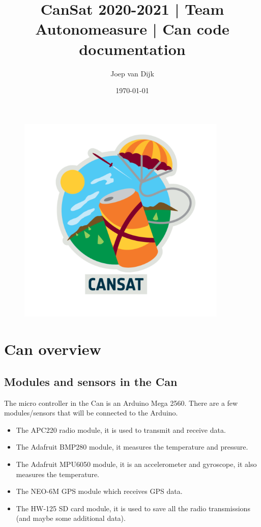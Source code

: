 \documentclass[a4paper,10pt]{article}
\author{Joep van Dijk}
\title{CanSat 2020-2021 | Team Autonomeasure | Can code documentation}
\date{\today}
\begin{document}
	\maketitle
	
	
	\begin{figure}[!h]
		\centering
		\includegraphics[width=100mm]{CanSat_logo}
	\end{figure}
	
	\clearpage
	
	\tableofcontents
	
	\clearpage
	
	
	
	\section[Can]{Can overview}
		\subsection[Modules]{Modules and sensors in the Can}
			The micro controller in the Can is an Arduino Mega 2560. There are a few modules/sensors that will be connected to the Arduino. 
			\begin{itemize}
				\item The APC220 radio module, it is used to transmit and receive data. 
				\item The Adafruit BMP280 module, it measures the temperature and pressure. 
				\item The Adafruit MPU6050 module, it is an accelerometer and gyroscope, it also measures the temperature. 
				\item The NEO-6M GPS module which receives GPS data. 
				\item The HW-125 SD card module, it is used to save all the radio transmissions (and maybe some additional data). 
			\end{itemize}
			
\end{document}
